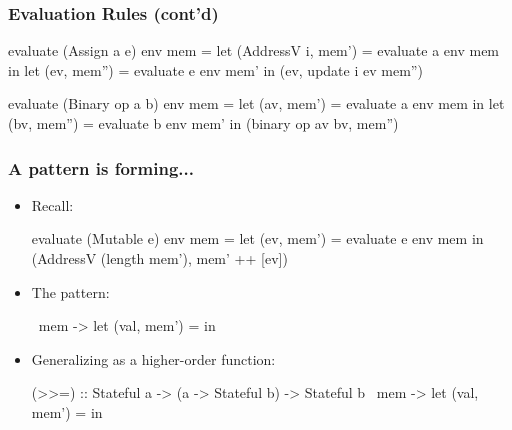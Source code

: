 \documentclass[xcolor=pdftex,dvipsnames,table]{beamer}
\begin{document}
\begin{frame}[fragile]
\frametitle{Evaluation Rules (cont'd)}

\begin{hcode}
evaluate (Assign a e) env mem =
  let 
     (AddressV i, mem') = evaluate a env mem
  in  
     let 
        (ev, mem'') = evaluate e env mem' 
     in
        (ev, update i ev mem'')
\end{hcode}

\begin{hcode}
evaluate (Binary op a b) env mem =
  let 
     (av, mem') = evaluate a env mem 
  in
     let 
        (bv, mem'') = evaluate b env mem' 
     in
        (binary op av bv, mem'')
\end{hcode}

\end{frame}

\begin{frame}[fragile]
\frametitle{A pattern is forming...}

\begin{itemize}
\item Recall:
\begin{hcode}
evaluate (Mutable e) env mem = 
   let (ev, mem') = evaluate e env mem
   in  (AddressV (length mem'), mem' ++ [ev])
\end{hcode}

\pause

\item The pattern:
\begin{hcode}
 \ mem -> 
   let
      (val, mem') = %
   in 
\end{hcode}

\pause

\item Generalizing as a higher-order function:
\begin{hcode}
(>>=) :: Stateful a -> (a -> Stateful b) -> Stateful b
 \ mem ->
   let
      (val, mem') = %
   in 
\end{hcode}
\end{itemize}

\end{frame}
\end{document}
